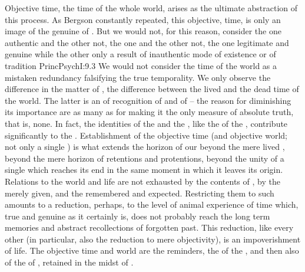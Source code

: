 Objective time, the time of the whole world, arises as the ultimate abstraction
of this  process. As Bergson constantly repeated, this objective,
 time, is only an image of the genuine  of
. But we would not, for this reason, consider the one authentic
and the other not, the one  and the other not, the one
legitimate and genuine while the other only a result of inauthentic mode of
existence or of tradition \citet{engulfing all [the] delicate idiosyncrasies in
  its monotonous sound.}{PrincPsych}{I:9.3} We would not consider the time of
the world as a mistaken redundancy falsifying the true temporality. We only
observe the difference in the matter of , the difference between
the lived  and the dead time of the 
world. The latter is an  of recognition of  and of
 -- the reason for diminishing its importance are as
many as for making it the only measure of absolute truth, that is, none.  In
fact, the identities of the  and the  , like
the  of the , contribute significantly to the
.  Establishment of the objective time (and objective
world; not only a single ) is what extends the horizon of our
 beyond the mere lived , beyond the mere horizon of
retentions and protentions, beyond the unity of a single  which reaches
its end in the same moment in which it leaves its origin.  Relations to the
world and life are not exhausted by the contents of ,
by the merely  given, and the  remembered and
expected. Restricting them to such  amounts to a reduction,
perhaps, to the level of animal experience of time which, true and genuine as it
certainly is, does not probably reach the long term memories and abstract
recollections of forgotten past. This reduction, like every other (in
particular, also the reduction to mere objectivity), is an impoverishment of
life.  The objective time and world are the reminders, the  of the
, and then also of the  of , retained in the midst of .



